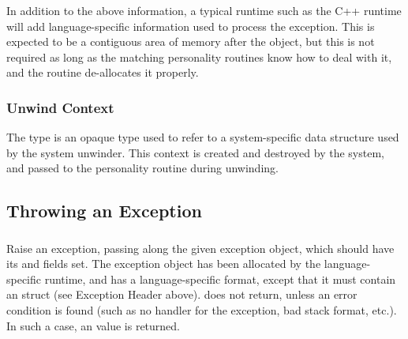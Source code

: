 In addition to the above information, a typical runtime such as the
C++ runtime will add language-specific information used to process the
exception.  This is expected to be a contiguous area of memory after
the  object, but this is not required as
long as the matching personality routines know how to deal with it,
and the  routine de-allocates it properly.

\subsubsection{Unwind Context}

The  type is an opaque type used to refer to a
system-specific data structure used by the system unwinder.  This context
is created and destroyed by the system, and passed to the personality
routine during unwinding.


\subsection{Throwing an Exception}

\subsubsection{}


Raise an exception, passing along the given exception object,
which should have its  and  fields
set. The exception object has been allocated by the language-specific
runtime, and has a language-specific format, except that it must
contain an  struct (see Exception Header above).
 does not return, unless an error condition is
found (such as no handler for the exception, bad stack format, etc.).
In such a case, an  value is returned.

